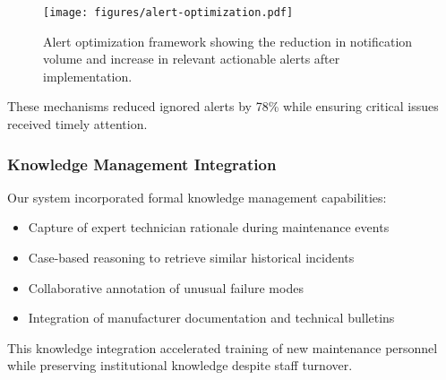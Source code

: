 \begin{figure}[t]
\centering
\texttt{[image: figures/alert-optimization.pdf]}
\caption{Alert optimization framework showing the reduction in notification volume and increase in relevant actionable alerts after implementation.}
\label{fig:alert_optimization}
\end{figure}

These mechanisms reduced ignored alerts by 78\% while ensuring critical issues received timely attention.

\subsubsection{Knowledge Management Integration}
Our system incorporated formal knowledge management capabilities:
\begin{itemize}
    \item Capture of expert technician rationale during maintenance events
    \item Case-based reasoning to retrieve similar historical incidents
    \item Collaborative annotation of unusual failure modes
    \item Integration of manufacturer documentation and technical bulletins
\end{itemize}

This knowledge integration accelerated training of new maintenance personnel while preserving institutional knowledge despite staff turnover.